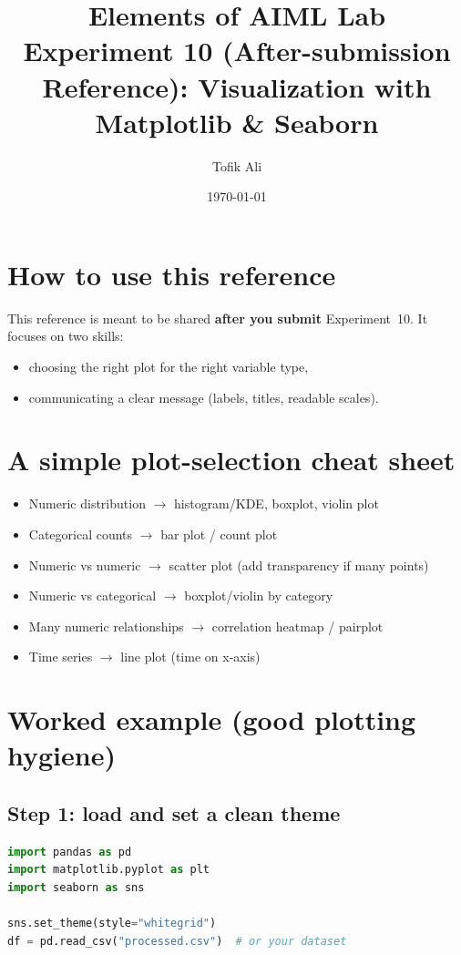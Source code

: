 \documentclass[11pt]{article}
\title{Elements of AIML Lab\\Experiment 10 (After-submission Reference): Visualization with Matplotlib \& Seaborn}
\author{Tofik Ali}
\date{\today}
\begin{document}
\maketitle
\tableofcontents

\section{How to use this reference}
This reference is meant to be shared \textbf{after you submit} Experiment~10.
It focuses on two skills:
\begin{itemize}[leftmargin=*]
  \item choosing the right plot for the right variable type,
  \item communicating a clear message (labels, titles, readable scales).
\end{itemize}

\section{A simple plot-selection cheat sheet}
\begin{itemize}[leftmargin=*]
  \item Numeric distribution $\rightarrow$ histogram/KDE, boxplot, violin plot
  \item Categorical counts $\rightarrow$ bar plot / count plot
  \item Numeric vs numeric $\rightarrow$ scatter plot (add transparency if many points)
  \item Numeric vs categorical $\rightarrow$ boxplot/violin by category
  \item Many numeric relationships $\rightarrow$ correlation heatmap / pairplot
  \item Time series $\rightarrow$ line plot (time on x-axis)
\end{itemize}

\section{Worked example (good plotting hygiene)}
\subsection{Step 1: load and set a clean theme}
\begin{lstlisting}[language=Python]
import pandas as pd
import matplotlib.pyplot as plt
import seaborn as sns

sns.set_theme(style="whitegrid")
df = pd.read_csv("processed.csv")  # or your dataset
\end{lstlisting}
\end{document}
